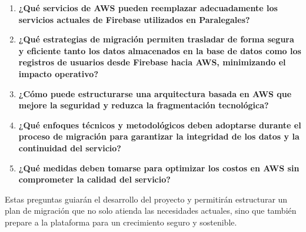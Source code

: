 \begin{enumerate}
  \item \textbf{¿Qué servicios de AWS pueden reemplazar adecuadamente los servicios actuales de Firebase utilizados en Paralegales?}
  \item \textbf{¿Qué estrategias de migración permiten trasladar de forma segura y eficiente tanto los datos almacenados en la base de datos como los registros de usuarios desde Firebase hacia AWS, minimizando el impacto operativo?}
  \item \textbf{¿Cómo puede estructurarse una arquitectura basada en AWS que mejore la seguridad y reduzca la fragmentación tecnológica?}
  \item \textbf{¿Qué enfoques técnicos y metodológicos deben adoptarse durante el proceso de migración para garantizar la integridad de los datos y la continuidad del servicio?}
  \item \textbf{¿Qué medidas deben tomarse para optimizar los costos en AWS sin comprometer la calidad del servicio?}
\end{enumerate}

Estas preguntas guiarán el desarrollo del proyecto y permitirán estructurar un plan de migración que no solo atienda las necesidades actuales, sino que también prepare a la plataforma para un crecimiento seguro y sostenible.
